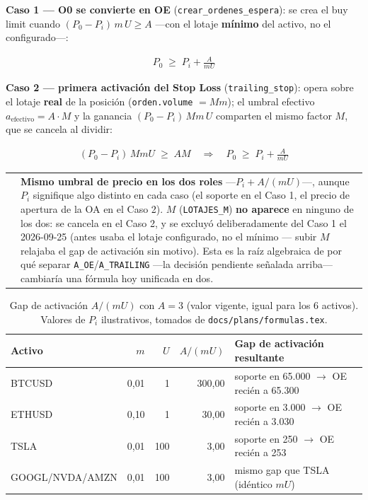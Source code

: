 \documentclass[11pt,a4paper]{article}
\makeatletter
\newcommand{\code}[1]{\texttt{\small #1}}
\newenvironment{clave}{%
  \par\medskip\noindent
  \begin{tabular}{@{}p{0.4em}@{\hspace{8pt}}p{\dimexpr\linewidth-2em\relax}@{}}
  \textcolor{cmorado}{\rule{3pt}{1.1em}} &
}{\end{tabular}\par\medskip}
\makeatother
\begin{document}
\textbf{Caso 1 — O0 se convierte en OE} (\code{crear\_ordenes\_espera}): se crea el buy
limit cuando \((P_0-P_i)\,m\,U \geq A\) —con el lotaje \textbf{mínimo} del activo, no el
configurado—:

\begin{align}
P_0 \;\geq\; P_i + \frac{A}{mU}
\end{align}

\textbf{Caso 2 — primera activación del Stop Loss} (\code{trailing\_stop}): opera sobre el
lotaje \textbf{real} de la posición (\code{orden.volume} \(=Mm\)); el umbral efectivo
\(a_{\mathrm{efectivo}} = A\cdot M\) y la ganancia \((P_0-P_i)\,Mm\,U\) comparten el mismo
factor \(M\), que se cancela al dividir:

\begin{align}
(P_0-P_i)\,MmU \;\geq\; AM \quad\Longrightarrow\quad P_0 \;\geq\; P_i + \frac{A}{mU}
\end{align}

\begin{clave}
\textbf{Mismo umbral de precio en los dos roles} —\(P_i + A/(mU)\)—, aunque \(P_i\)
signifique algo distinto en cada caso (el soporte en el Caso 1, el precio de apertura de
la OA en el Caso 2). \(M\) (\code{LOTAJES\_M}) \textbf{no aparece} en ninguno de los dos:
se cancela en el Caso 2, y se excluyó deliberadamente del Caso 1 el 2026-09-25 (antes
usaba el lotaje configurado, no el mínimo — subir \(M\) relajaba el gap de activación sin
motivo). Esta es la raíz algebraica de por qué separar \code{A\_OE}/\code{A\_TRAILING}
—la decisión pendiente señalada arriba— cambiaría una fórmula hoy unificada en dos.
\end{clave}

\begin{table}[h]
\centering
\small
\begin{tabularx}{\linewidth}{@{}l r r r X@{}}
\toprule
\textbf{Activo} & \(m\) & \(U\) & \(A/(mU)\) & \textbf{Gap de activación resultante} \\
\midrule
BTCUSD & 0{,}01 & 1   & 300{,}00 & soporte en 65.000 \(\to\) OE recién a 65.300 \\
ETHUSD & 0{,}10 & 1   & 30{,}00  & soporte en 3.000 \(\to\) OE recién a 3.030 \\
TSLA   & 0{,}01 & 100 & 3{,}00   & soporte en 250 \(\to\) OE recién a 253 \\
GOOGL/NVDA/AMZN & 0{,}01 & 100 & 3{,}00 & mismo gap que TSLA (idéntico \(mU\)) \\
\bottomrule
\end{tabularx}
\caption{Gap de activación \(A/(mU)\) con \(A=3\) (valor vigente, igual para los 6
activos). Valores de \(P_i\) ilustrativos, tomados de \code{docs/plans/formulas.tex}.}
\end{table}
\end{document}
